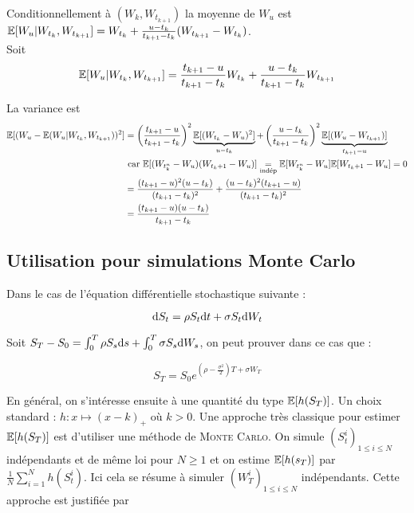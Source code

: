 Conditionnellement à $(W_k, W_{t_{k+1}})$ la moyenne de $W_u$ est $\mathbb{E}[W_u \vert W_{t_k}, W_{t_{k+1}}] = W_{t_k} + \frac{u-t_k}{t_{k+1} - t_k}(W_{t_{k+1}} - W_{t_k})$. \\

Soit 
\begin{equation*}
\begin{split}
  \mathbb{E}[W_u \vert W_{t_k}, W_{t_{k+1}}] = \frac{t_{k+1} - u}{t_{k+1} - t_k} W_{t_k} + \frac{u - t_k}{t_{k+1} -t_k} W_{t_{k+1}}
\end{split}
\end{equation*}

La variance est 
\begin{equation*}
\begin{split}
  \mathbb{E}[(W_u - \mathbb{E}(W_u \vert W_{t_k}, W_{t_{k+1}}))^2] &= \left(\frac{t_{k+1} - u}{t_{k+1}-t_k}\right)^2  \underbrace{\mathbb{E}[(W_{t_k}-W_u)^2]}_{u-t_k} + \left( \frac{u-t_k}{t_{k+1} - t_k} \right)^2 \underbrace{\mathbb{E}[(W_u-W_{t_{k+1}})]}_{t_{k+1} - u} \\
  &\text{ car } \mathbb{E}[(W_{t_k^n} - W_u)(W_{t_k+1} - W_u)] \underset{\text{indép}}{=} \mathbb{E}[W_{t_k^n} - W_u]\mathbb{E}[W_{t_k+1} - W_u] = 0 \\ 
  &= \frac{(t_{k+1}-u)^2 (u-t_k)}{(t_{k+1} - t_k)^2} + \frac{(u-t_k)^2 (t_{k+1}-u)}{(t_{k+1} - t_k)^2} \\
  &= \frac{(t_{k+1}-u)(u-t_k)}{t_{k+1} - t_k}
\end{split}
\end{equation*}

\subsection{Utilisation pour simulations Monte Carlo}
Dans le cas de l'équation différentielle stochastique suivante :

\[ \mathrm{d} S_t = \rho S_t \mathrm{d} t + \sigma S_t \mathrm{d} W_t \]

Soit $S_T - S_0 = \int_{0}^{T} \rho S_s \mathrm{d} s + \int_{0}^{T} \sigma S_s \mathrm{d} W_s$, on peut prouver dans ce cas que :

\[ S_T = S_0 e^{\left(\rho- \frac{\sigma^2}{2}\right)T + \sigma W_T} \]

En général, on s'intéresse ensuite à une quantité du type $\mathbb{E}[h(S_T)]$. Un choix standard : $h : x \mapsto (x-k)_+$ où $k>0$. Une approche très classique pour estimer $\mathbb{E}[h(S_T)]$ est d'utiliser une méthode de \textsc{Monte Carlo}. On simule $(S_t^i)_{1\leq i \leq N}$ indépendants et de même loi pour $N \geq 1$ et on estime $\mathbb{E}[h(s_T)]$ par $ \frac{1}{N} \sum_{i=1}^{N} h(S_t^i)$. Ici cela se résume à simuler $(W_T^i)_{1 \leq i \leq N}$ indépendants. Cette approche est justifiée par 


